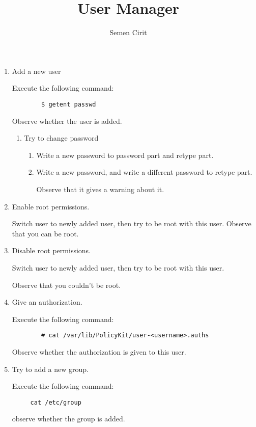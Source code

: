 \documentclass[a4paper,10pt]{article}
\title{User Manager}
\author{Semen Cirit}
\begin{document}
\maketitle
\begin{enumerate}
\item Add a new user

    Execute the following command:
    \begin{verbatim}
        $ getent passwd 
    \end{verbatim}
    Observe whether the user is added.

    \begin{enumerate}
    \item Try to change password
        \begin{enumerate}
        \item Write a new password to password part and retype part.
        \item Write a new password, and write a different password to retype part.

                Observe that it gives a warning about it.
        \end{enumerate}
    \end{enumerate}

    \item Enable root permissions.

          Switch user to newly added user, then try to be root with this user.
        Observe that you can be root.
    \item Disable root permissions.

        Switch user to newly added user, then try to be root with this user.
    
        Observe that you couldn't be root.

    \item Give an authorization.

        Execute the following command:
    \begin{verbatim}
        # cat /var/lib/PolicyKit/user-<username>.auths
    \end{verbatim}
        Observe whether the authorization is given to this user.

    
\item Try to add a new group.

     Execute the following command:
\begin{verbatim}
     cat /etc/group
 \end{verbatim}
     observe whether the group is added.


\end{enumerate}
\end{document}
